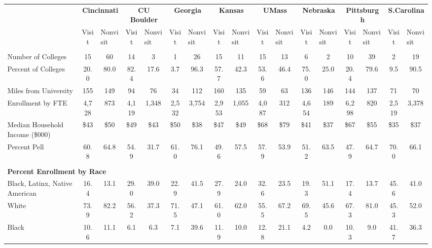 \begin{tabular*}{\linewidth}{@{\extracolsep{\fill} } lcccccccccccccccc}%
&\multicolumn{2}{c}{\bfseries Cincinnati}&\multicolumn{2}{c}{\bfseries CU Boulder}&\multicolumn{2}{c}{\bfseries Georgia}&\multicolumn{2}{c}{\bfseries Kansas}&\multicolumn{2}{c}{\bfseries UMass}&\multicolumn{2}{c}{\bfseries Nebraska}&\multicolumn{2}{c}{\bfseries Pittsburgh}&\multicolumn{2}{c}{\bfseries S.Carolina}\\%
&Visit&\multicolumn{1}{l}{Nonvisit}&Visit&\multicolumn{1}{l}{Nonvisit}&Visit&\multicolumn{1}{l}{Nonvisit}&Visit&\multicolumn{1}{l}{Nonvisit}&Visit&\multicolumn{1}{l}{Nonvisit}&Visit&\multicolumn{1}{l}{Nonvisit}&Visit&\multicolumn{1}{l}{Nonvisit}&Visit&\multicolumn{1}{l}{Nonvisit}\\%
\hline%
&&&&&&&&&&&&&&&&\\%
\hspace{0cm}Number of Colleges&15&60&14&3&1&26&15&11&15&13&6&2&10&39&2&19\\%
Percent of Colleges&20.0&80.0&82.4&17.6&3.7&96.3&57.7&42.3&53.6&46.4&75.0&25.0&20.4&79.6&9.5&90.5\\%
\hspace{0cm}Miles from University&155&149&94&76&34&112&160&135&59&63&136&146&144&137&71&70\\%
\hspace{0cm}Enrollment by FTE&4,728&873&4,119&1,348&2,532&3,754&2,953&1,055&4,087&312&4,654&189&6,298&820&2,519&3,378\\%
\hspace{0cm}Median Household Income (\$000)&\$43&\$50&\$49&\$43&\$50&\$38&\$47&\$49&\$68&\$79&\$41&\$37&\$67&\$55&\$35&\$37\\%
\hspace{0cm}Percent Pell&60.8&64.8&54.9&31.7&61.0&76.1&49.6&57.5&57.9&53.9&51.2&63.5&47.9&64.7&70.0&66.1\\%
&&&&&&&&&&&&&&&&\\%
\multicolumn{17}{l}{\bfseries Percent Enrollment by Race}\\%
\hspace{0.2cm}Black, Latinx, Native American&16.4&13.1&29.0&39.0&22.9&41.5&27.9&24.0&32.6&23.5&19.3&51.1&17.4&13.7&45.6&41.0\\%
\hspace{0.2cm}White&73.9&82.2&56.2&37.3&71.5&47.1&61.0&62.0&55.5&67.2&69.5&45.6&67.3&81.0&45.3&52.0\\%
\hspace{0.2cm}Black&10.6&11.1&6.1&6.3&7.1&39.6&11.9&10.0&12.8&21.1&4.2&0.0&10.3&9.0&41.7&36.3\\%

\end{tabular*}
